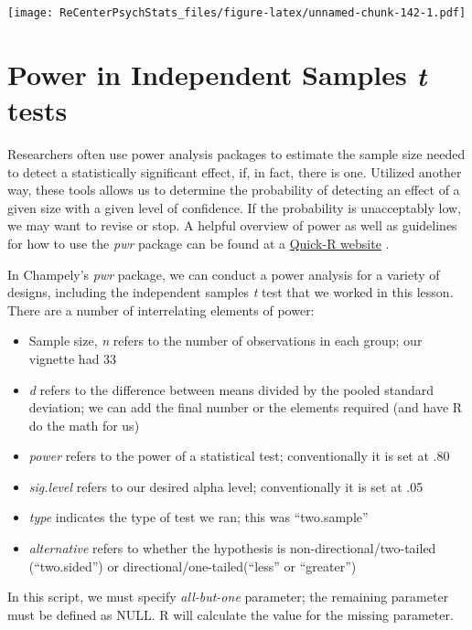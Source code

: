 \documentclass[
  11pt,
]{book}
\providecommand{\tightlist}{%
  \setlength{\itemsep}{0pt}\setlength{\parskip}{0pt}}
\begin{document}
\texttt{[image: ReCenterPsychStats\_files/figure-latex/unnamed-chunk-142-1.pdf]}

\hypertarget{power-in-independent-samples-t-tests-1}{%
\section{\texorpdfstring{Power in Independent Samples \emph{t} tests}{Power in Independent Samples t tests}}\label{power-in-independent-samples-t-tests-1}}

Researchers often use power analysis packages to estimate the sample size needed to detect a statistically significant effect, if, in fact, there is one. Utilized another way, these tools allows us to determine the probability of detecting an effect of a given size with a given level of confidence. If the probability is unacceptably low, we may want to revise or stop. A helpful overview of power as well as guidelines for how to use the \emph{pwr} package can be found at a \href{https://www.statmethods.net/stats/power.html}{Quick-R website} \citep{kabacoff_power_2017}.

In Champely's \emph{pwr} package, we can conduct a power analysis for a variety of designs, including the independent samples \emph{t} test that we worked in this lesson. There are a number of interrelating elements of power:

\begin{itemize}
\tightlist
\item
  Sample size, \emph{n} refers to the number of observations in each group; our vignette had 33
\item
  \emph{d} refers to the difference between means divided by the pooled standard deviation; we can add the final number or the elements required (and have R do the math for us)
\item
  \emph{power} refers to the power of a statistical test; conventionally it is set at .80
\item
  \emph{sig.level} refers to our desired alpha level; conventionally it is set at .05
\item
  \emph{type} indicates the type of test we ran; this was ``two.sample''
\item
  \emph{alternative} refers to whether the hypothesis is non-directional/two-tailed (``two.sided'') or directional/one-tailed(``less'' or ``greater'')
\end{itemize}

In this script, we must specify \emph{all-but-one} parameter; the remaining parameter must be defined as NULL. R will calculate the value for the missing parameter.
\end{document}
